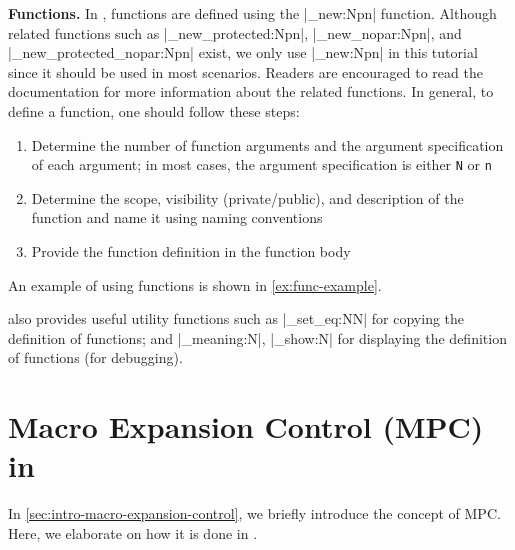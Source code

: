 \documentclass{ltugboat}
\begin{document}
\par\medskip\noindent\textbf{Functions.}
In \LTT{}, functions are defined using the \inltex|\cs_new:Npn| function.
Although related functions such as \inltex|\cs_new_protected:Npn|, \inltex|\cs_new_nopar:Npn|, and \inltex|\cs_new_protected_nopar:Npn| exist, we only use \inltex|\cs_new:Npn| in this tutorial since it should be used in most scenarios. 
Readers are encouraged to read the \LTT{} documentation for more information about the related functions.
In general, to define a function, one should follow these steps:
\begin{enumerate}
    \item Determine the number of function arguments and the argument specification of each argument; in most cases, the argument specification is either \verb|N| or \verb|n|
    \item Determine the scope, visibility (private/public), and description of the function and name it using \LTT{} naming conventions
    \item Provide the function definition in the function body
\end{enumerate}
An example of using functions is shown in \cref{ex:func-example}.


\LTT{} also provides useful utility functions such as \inltex|\cs_set_eq:NN| for copying the definition of functions; and \inltex|\cs_meaning:N|, \inltex|\cs_show:N| for displaying the definition of functions (for debugging).

\section{Macro Expansion Control (MPC) in \LTT{}}
In \cref{sec:intro-macro-expansion-control}, we briefly introduce the concept of MPC.
Here, we elaborate on how it is done in \LTT{}.
\end{document}

